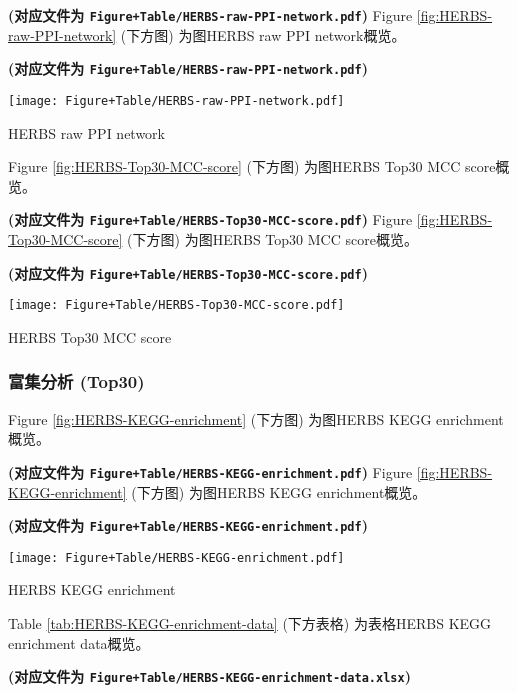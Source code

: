 \documentclass[
]{article}
\begin{document}
\textbf{(对应文件为 \texttt{Figure+Table/HERBS-raw-PPI-network.pdf})}
Figure \ref{fig:HERBS-raw-PPI-network} (下方图) 为图HERBS raw PPI network概览。

\textbf{(对应文件为 \texttt{Figure+Table/HERBS-raw-PPI-network.pdf})}

\def\@captype{figure}
\begin{center}
\texttt{[image: Figure+Table/HERBS-raw-PPI-network.pdf]}
\caption{HERBS raw PPI network}\label{fig:HERBS-raw-PPI-network}
\end{center}

Figure \ref{fig:HERBS-Top30-MCC-score} (下方图) 为图HERBS Top30 MCC score概览。

\textbf{(对应文件为 \texttt{Figure+Table/HERBS-Top30-MCC-score.pdf})}
Figure \ref{fig:HERBS-Top30-MCC-score} (下方图) 为图HERBS Top30 MCC score概览。

\textbf{(对应文件为 \texttt{Figure+Table/HERBS-Top30-MCC-score.pdf})}

\def\@captype{figure}
\begin{center}
\texttt{[image: Figure+Table/HERBS-Top30-MCC-score.pdf]}
\caption{HERBS Top30 MCC score}\label{fig:HERBS-Top30-MCC-score}
\end{center}

\hypertarget{ux5bccux96c6ux5206ux6790-top30}{%
\subsubsection{富集分析 (Top30)}\label{ux5bccux96c6ux5206ux6790-top30}}

Figure \ref{fig:HERBS-KEGG-enrichment} (下方图) 为图HERBS KEGG enrichment概览。

\textbf{(对应文件为 \texttt{Figure+Table/HERBS-KEGG-enrichment.pdf})}
Figure \ref{fig:HERBS-KEGG-enrichment} (下方图) 为图HERBS KEGG enrichment概览。

\textbf{(对应文件为 \texttt{Figure+Table/HERBS-KEGG-enrichment.pdf})}

\def\@captype{figure}
\begin{center}
\texttt{[image: Figure+Table/HERBS-KEGG-enrichment.pdf]}
\caption{HERBS KEGG enrichment}\label{fig:HERBS-KEGG-enrichment}
\end{center}

Table \ref{tab:HERBS-KEGG-enrichment-data} (下方表格) 为表格HERBS KEGG enrichment data概览。

\textbf{(对应文件为 \texttt{Figure+Table/HERBS-KEGG-enrichment-data.xlsx})}
\end{document}
